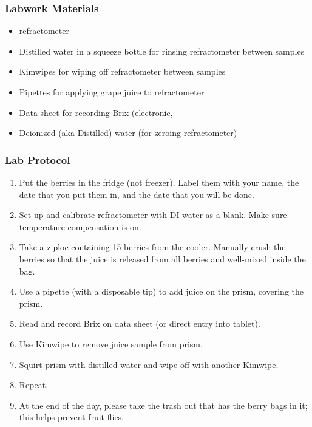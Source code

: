 \documentclass[11pt,letter]{article}
\newenvironment{smitemize}{
\begin{itemize}
  \setlength{\itemsep}{0pt}
  \setlength{\parskip}{0.8pt}
  \setlength{\parsep}{0pt}}
{\end{itemize}
}
\begin{document}
\subsubsection{Labwork Materials}
\begin{smitemize}
\item refractometer %
\item Distilled water in a squeeze bottle for rinsing refractometer between samples
\item Kimwipes for wiping off refractometer between samples
\item Pipettes for applying grape juice to refractometer 
\item Data sheet for recording Brix (electronic, %
\item Deionized (aka Distilled) water (for zeroing refractometer)

\end{smitemize}

\subsubsection{Lab Protocol}
\begin{enumerate}
\item Put the berries in the fridge (not freezer). Label them with your name, the date that you put them in, and the date that you will be done.
\item Set up and calibrate refractometer with DI water as a blank. Make sure temperature compensation is on. 
\item Take a ziploc containing 15 berries from the cooler. Manually crush the berries so that the juice is released from all berries and well-mixed inside the bag. 
\item Use a pipette (with a disposable tip) to add juice on the prism, covering the prism. %
\item Read and record Brix on data sheet (or direct entry into tablet).   
\item Use Kimwipe to remove juice sample from prism. 
\item Squirt prism with distilled water and wipe off with another Kimwipe. 
\item Repeat. 
\item At the end of the day, please take the trash out that has the berry bags in it; this helps prevent fruit flies.
\end{enumerate}
\end{document}

